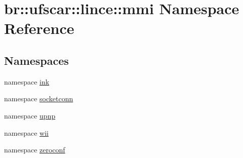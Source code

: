 \hypertarget{namespacebr_1_1ufscar_1_1lince_1_1mmi}{
\section{br::ufscar::lince::mmi Namespace Reference}
\label{namespacebr_1_1ufscar_1_1lince_1_1mmi}
}
\subsection*{Namespaces}
\begin{DoxyCompactItemize}
\item 
namespace \hyperlink{namespacebr_1_1ufscar_1_1lince_1_1mmi_1_1ink}{ink}
\item 
namespace \hyperlink{namespacebr_1_1ufscar_1_1lince_1_1mmi_1_1socketconn}{socketconn}
\item 
namespace \hyperlink{namespacebr_1_1ufscar_1_1lince_1_1mmi_1_1upnp}{upnp}
\item 
namespace \hyperlink{namespacebr_1_1ufscar_1_1lince_1_1mmi_1_1wii}{wii}
\item 
namespace \hyperlink{namespacebr_1_1ufscar_1_1lince_1_1mmi_1_1zeroconf}{zeroconf}
\end{DoxyCompactItemize}
